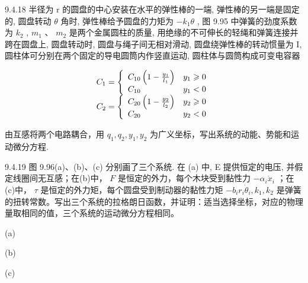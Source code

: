 \begin{problem}{9.4.18}
半径为 r 的圆盘的中心安装在水平的弹性棒的一端, 弹性棒的另一端是固定的, 圆盘转动 $\theta$ 角时, 弹性棒给予圆盘的力矩为 $-k_{1}\theta$ , 图 9.95 中弹簧的劲度系数为 $k_{2}$ , $m_{1}$ 、 $m_{2}$ 是两个金属圆柱的质量, 用绝缘的不可伸长的轻绳和弹簧连接并跨在圆盘上, 圆盘转动时, 圆盘与绳子间无相对滑动, 圆盘绕弹性棒的转动惯量为 I, 圆柱体可分别在两个固定的导电圆筒内作竖直运动, 圆柱体与圆筒构成可变电容器

\[
\begin{array}{l l} C _ {1} = \left\{ \begin{array}{l l} C _ {1 0} \left(1 - \frac {y _ {1}}{l _ {1}}\right) & y _ {1} \geqslant 0 \\ C _ {1 0} & y _ {1} <   0 \end{array} \right. \\ C _ {2} = \left\{ \begin{array}{l l} C _ {2 0} \left(1 - \frac {y _ {2}}{l _ {2}}\right) & y _ {2} \geqslant 0 \\ C _ {2 0} & y _ {2} <   0 \end{array} \right. \end{array}
\]

由互感将两个电路耦合，用 $q_{1}, q_{2}, y_{1}, y_{2}$ 为广义坐标，写出系统的动能、势能和运动微分方程.
\begin{center}

\end{center}
\end{problem}
\clearpage


\begin{problem}{9.4.19}
图 9.96(a)、(b)、(c) 分别画了三个系统. 在 (a) 中, E 提供恒定的电压, 并假定线圈间无互感；在(b)中， $F$ 是恒定的外力，每个木块受到黏性力 $-\alpha_{i} \dot{x}_{i}$ ；在(c)中， $\tau$ 是恒定的外力矩，每个圆盘受到制动器的黏性力矩 $-b_{i} r_{i} \dot{\theta}_{i}, k_{1}, k_{2}$ 是弹簧的扭转常数。写出三个系统的拉格朗日函数，并证明：适当选择坐标，对应的物理量取相同的值，三个系统的运动微分方程相同。

(a)

(b)

(c)
\begin{center}

\end{center}
\begin{center}

\end{center}
\begin{center}

\end{center}
\end{problem}
\clearpage



